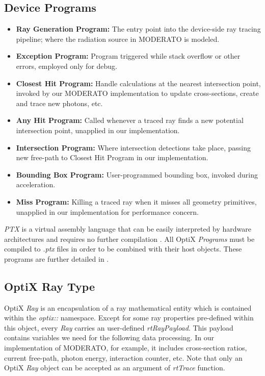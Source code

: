 \subsection{Device Programs}
\begin{itemize}
  \item \textbf{Ray Generation Program:} The entry point into the device-side ray tracing pipeline; where the radiation source in MODERATO is modeled.
  \item \textbf{Exception Program:} Program triggered while stack overflow or other errors, employed only for debug.
  \item \textbf{Closest Hit Program:} Handle calculations at the nearest intersection point, invoked by our MODERATO implementation to update cross-sections, create and trace new photons, etc.
  \item \textbf{Any Hit Program:} Called whenever a traced ray finds a new potential intersection point, unapplied in our implementation.
  \item \textbf{Intersection Program:} Where intersection detections take place, passing new free-path to Closest Hit Program in our implementation.
  \item \textbf{Bounding Box Program:} User-programmed bounding box, invoked during acceleration.
  \item \textbf{Miss Program:} Killing a traced ray when it misses all geometry primitives, unapplied in our implementation for performance concern.
\end{itemize}
\textit{PTX} is a virtual assembly language that can be easily interpreted by hardware architectures and requires no further compilation \citep{Reference2}. All OptiX \textit{Programs} must be compiled to \textit{.ptx} files in order to be combined with their host objects. These programs are further detailed in .

\subsection{OptiX Ray Type}
OptiX \textit{Ray} is an encapsulation of a ray mathematical entity which is contained within the \textit{optix::} namespace. Except for some ray properties pre-defined within this object, every \textit{Ray} carries an user-defined \textit{rtRayPayload}. This payload contains variables we need for the following data processing. In our implementation of MODERATO, for example, it includes cross-section ratios, current free-path, photon energy, interaction counter, etc. Note that only an OptiX \textit{Ray} object can be accepted as an argument of \textit{rtTrace} function.

